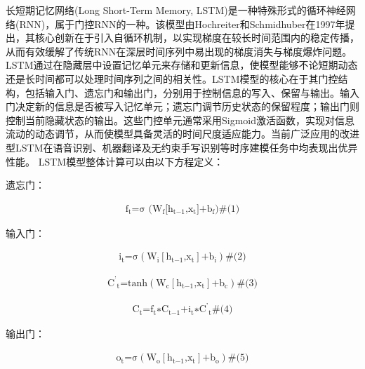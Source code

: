 \documentclass[
  12pt,
]{article}
\begin{document}
长短期记忆网络(Long Short-Term Memory,
LSTM)是一种特殊形式的循环神经网络(RNN)，属于门控RNN的一种。该模型由Hochreiter和Schmidhuber在1997年提出，其核心创新在于引入自循环机制，以实现梯度在较长时间范围内的稳定传播，从而有效缓解了传统RNN在深层时间序列中易出现的梯度消失与梯度爆炸问题。LSTM通过在隐藏层中设置记忆单元来存储和更新信息，使模型能够不论短期动态还是长时间都可以处理时间序列之间的相关性。LSTM模型的核心在于其门控结构，包括输入门、遗忘门和输出门，分别用于控制信息的写入、保留与输出。输入门决定新的信息是否被写入记忆单元；遗忘门调节历史状态的保留程度；输出门则控制当前隐藏状态的输出。这些门控单元通常采用Sigmoid激活函数，实现对信息流动的动态调节，从而使模型具备灵活的时间尺度适应能力。当前广泛应用的改进型LSTM在语音识别、机器翻译及无约束手写识别等时序建模任务中均表现出优异性能。
LSTM模型整体计算可以由以下方程定义：

遗忘门：

\[\begin{array}{r}
\text{f}_{\text{t}}\text{=σ (}\text{W}_{\text{f}}\text{[}\text{h}_{\text{t−1}}\text{,}\text{x}_{\text{t}}\text{]+}\text{b}_{\text{f}}\text{)}\#\text{(1)}
\end{array}\]

输入门：

\[\begin{array}{r}
\text{i}_{\text{t}}\text{=σ}\left( \text{W}_{\text{i}}\left\lbrack \text{h}_{\text{t−1}}\text{,}\text{x}_{\text{t}} \right\rbrack\text{+}\text{b}_{\text{i}} \right)\#\text{(2)}
\end{array}\]

\[\begin{array}{r}
{\text{C}^{\text{'}}}_{\text{t}}\text{=}\text{tan}\text{h}\left( \text{W}_{\text{c}}\left\lbrack \text{h}_{\text{t−1}}\text{,}\text{x}_{\text{t}} \right\rbrack\text{+}\text{b}_{\text{c}} \right)\#\text{(3)}
\end{array}\]

\[\begin{array}{r}
\text{C}_{\text{t}}\text{=}\text{f}_{\text{t}}\text{∗}\text{C}_{\text{t−1}}\text{+}\text{i}_{\text{t}}\text{∗}{\text{C}^{\text{'}}}_{\text{t}}\#\text{(4)}
\end{array}\]

输出门：

\[\begin{array}{r}
\text{o}_{\text{t}}\text{=σ}\left( \text{W}_{\text{o}}\left\lbrack \text{h}_{\text{t−1}}\text{,}\text{x}_{\text{t}} \right\rbrack\text{+}\text{b}_{\text{o}} \right)\#\text{(5)}
\end{array}\]
\end{document}
